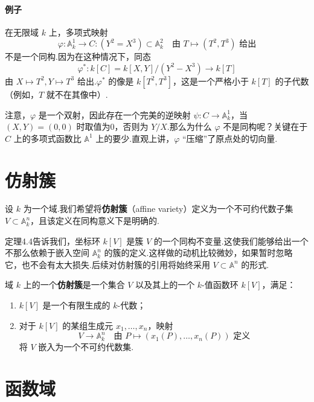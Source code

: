 \paragraph{例子} 在无限域 \(k\) 上，多项式映射
\[
\varphi  : {\mathbb{A}}_{k}^{1} \rightarrow  C : (Y^2 = X^3) \subset  {\mathbb{A}}_{k}^{2} \quad \text{由 } T \mapsto  (T^2, T^3) \text{ 给出}
\]
不是一个同构.因为在这种情况下，同态
\[
{\varphi }^{ * } : k[C] = k[X,Y]/(Y^2 - X^3) \rightarrow  k[T]
\]
由 \(X \mapsto  T^2, Y \mapsto  T^3\) 给出.\({\varphi }^{ * }\) 的像是 \(k[T^2, T^3]\)，这是一个严格小于 \(k[T]\) 的子代数（例如，\(T\) 就不在其像中）.

注意，\(\varphi\) 是一个双射，因此存在一个完美的逆映射 \(\psi  : C \rightarrow  {\mathbb{A}}_{k}^{1}\)，当 \((X,Y) = (0,0)\) 时取值为0，否则为 \(Y/X\).那么为什么 \(\varphi\) 不是同构呢？关键在于 \(C\) 上的多项式函数比 \({\mathbb{A}}^{1}\) 上的要少.直观上讲，\(\varphi\) “压缩”了原点处的切向量.

\section{仿射簇}

设 \(k\) 为一个域.我们希望将\textbf{仿射簇}（affine variety）定义为一个不可约代数子集 \(V \subset  {\mathbb{A}}_{k}^{n}\)，且该定义在同构意义下是明确的.

定理4.4告诉我们，坐标环 \(k[V]\) 是簇 \(V\) 的一个同构不变量.这使我们能够给出一个不那么依赖于嵌入空间 \({\mathbb{A}}_{k}^{n}\) 的簇的定义.这样做的动机比较微妙，如果暂时忽略它，也不会有太大损失.后续对仿射簇的引用将始终采用 \(V \subset {\mathbb{A}}^n\) 的形式.

\begin{definition}
域 \(k\) 上的一个\textbf{仿射簇}是一个集合 \(V\) 以及其上的一个 \(k\)-值函数环 \(k[V]\)，满足：
\begin{enumerate}
    \item \(k[V]\) 是一个有限生成的 \(k\)-代数；
    \item 对于 \(k[V]\) 的某组生成元 \({x}_{1},\ldots ,{x}_{n}\)，映射
    \[
    V \rightarrow  {\mathbb{A}}_{k}^{n} \quad \text{由 } P \mapsto  (x_1(P), \ldots, x_n(P)) \text{ 定义}
    \]
    将 \(V\) 嵌入为一个不可约代数集.
\end{enumerate}
\end{definition}

\section{函数域}


